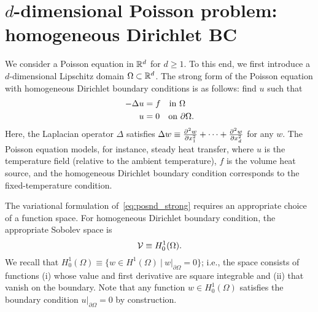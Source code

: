 \section{$d$-dimensional Poisson problem: homogeneous Dirichlet BC}
\label{sec:posnd_homo_dir}
We consider a Poisson equation in $\mathbb{R}^d$ for $d \geq 1$.  To this end, we first introduce a $d$-dimensional Lipschitz domain $\Omega \subset \mathbb{R}^d$. The strong form of the Poisson equation with homogeneous Dirichlet boundary conditions is as follows: find $u$ such that
\begin{align}
  - \Delta u &= f \quad \text{in } \Omega \label{eq:posnd_strong} \\
  u &= 0 \quad \text{on } \partial \Omega \notag.
\end{align}
 Here, the Laplacian operator $\Delta$ satisfies $\Delta w \equiv \frac{\partial ^2w}{\partial x^2_1} + \cdots + \frac{\partial ^2w}{\partial x^2_d}$ for any $w$.  The Poisson equation models, for instance, steady heat transfer, where $u$ is the temperature field (relative to the ambient temperature), $f$ is the volume heat source, and the homogeneous Dirichlet boundary condition corresponds to the fixed-temperature condition.

The variational formulation of~\eqref{eq:posnd_strong} requires an appropriate choice of a function space.  For homogeneous Dirichlet boundary condition, the appropriate Sobolev space is
\begin{equation*}
  \mathcal{V} \equiv H^1_0(\Omega).
\end{equation*}
We recall that $H^1_0(\Omega) \equiv \{ w \in H^1(\Omega) \ | \ w|_{\partial \Omega} = 0 \}$; i.e., the space consists of functions (i) whose value and first derivative are square integrable and (ii) that vanish on the boundary.  Note that any function $w \in H^1_0(\Omega)$ satisfies the boundary condition $u|_{\partial \Omega} = 0$ by construction.

